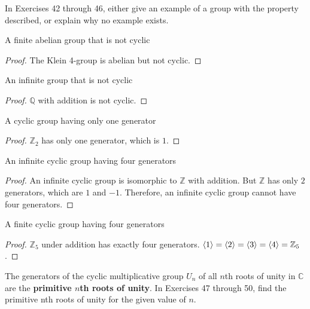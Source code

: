 In Exercises 42 through 46, either give an example of a group with the property described, or explain why no example exists.

\newpage
\begin{exercise}
    A finite abelian group that is not cyclic
\end{exercise}

\begin{proof}
    The Klein 4-group is abelian but not cyclic.
\end{proof}

\newpage
\begin{exercise}
    An infinite group that is not cyclic
\end{exercise}

\begin{proof}
    $\mathbb{Q}$ with addition is not cyclic.
\end{proof}

\newpage
\begin{exercise}
    A cyclic group having only one generator
\end{exercise}

\begin{proof}
    $\mathbb{Z}_{2}$ has only one generator, which is $1$.
\end{proof}

\newpage
\begin{exercise}
    An infinite cyclic group having four generators
\end{exercise}

\begin{proof}
    An infinite cyclic group is isomorphic to $\mathbb{Z}$ with addition. But $\mathbb{Z}$ has only $2$ generators, which are $1$ and $-1$. Therefore, an infinite cyclic group cannot have four generators.
\end{proof}

\newpage
\begin{exercise}
    A finite cyclic group having four generators
\end{exercise}

\begin{proof}
    $\mathbb{Z}_{5}$ under addition has exactly four generators. $\left\langle{1}\right\rangle = \left\langle{2}\right\rangle = \left\langle{3}\right\rangle = \left\langle{4}\right\rangle = \mathbb{Z}_{5}$.
\end{proof}

The generators of the cyclic multiplicative group $U_{n}$ of all $n$th roots of unity in $\mathbb{C}$ are the \textbf{primitive $n$th roots of unity}. In Exercises 47 through 50, find the primitive nth roots of unity for the given value of $n$.

